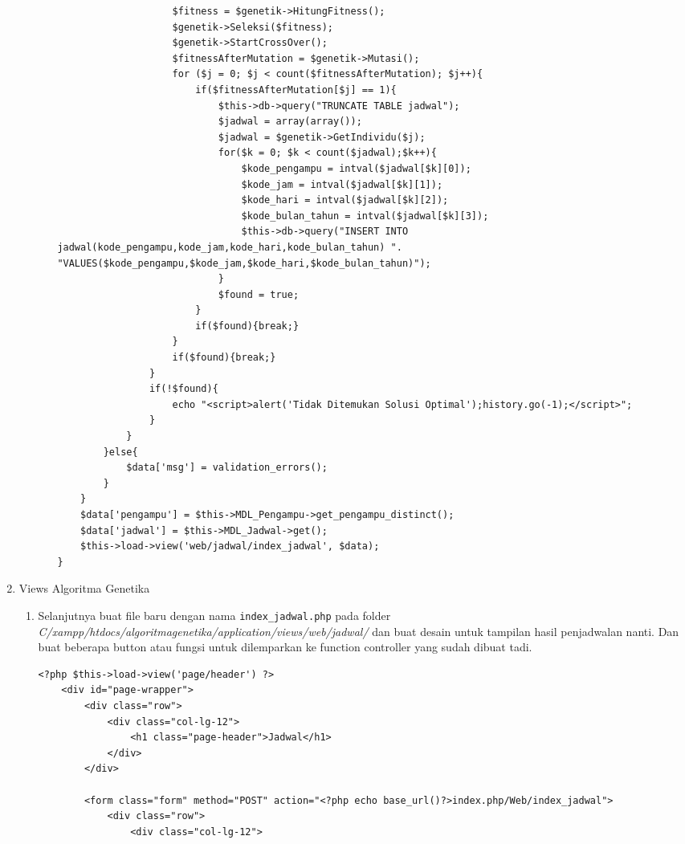 \begin{enumerate}
\begin{enumerate}
\begin{enumerate}
\begin{lstlisting}
					$fitness = $genetik->HitungFitness();
					$genetik->Seleksi($fitness);
					$genetik->StartCrossOver();
					$fitnessAfterMutation = $genetik->Mutasi();
					for ($j = 0; $j < count($fitnessAfterMutation); $j++){
						if($fitnessAfterMutation[$j] == 1){
							$this->db->query("TRUNCATE TABLE jadwal");
							$jadwal = array(array());
							$jadwal = $genetik->GetIndividu($j);
							for($k = 0; $k < count($jadwal);$k++){
								$kode_pengampu = intval($jadwal[$k][0]);
								$kode_jam = intval($jadwal[$k][1]);
								$kode_hari = intval($jadwal[$k][2]);
								$kode_bulan_tahun = intval($jadwal[$k][3]);
								$this->db->query("INSERT INTO jadwal(kode_pengampu,kode_jam,kode_hari,kode_bulan_tahun) ".	 "VALUES($kode_pengampu,$kode_jam,$kode_hari,$kode_bulan_tahun)");
							}
							$found = true;								
						}
						if($found){break;}
					}
					if($found){break;}
				}
				if(!$found){
					echo "<script>alert('Tidak Ditemukan Solusi Optimal');history.go(-1);</script>";
				}
			}
		}else{
			$data['msg'] = validation_errors();
		}
	}	
	$data['pengampu'] = $this->MDL_Pengampu->get_pengampu_distinct();
	$data['jadwal'] = $this->MDL_Jadwal->get();
	$this->load->view('web/jadwal/index_jadwal', $data);
}
\end{lstlisting}
        \end{enumerate}
    \end{enumerate}
        		
        \item Views Algoritma Genetika
        \begin{enumerate}
    	\item Selanjutnya buat file baru dengan nama \verb|index_jadwal.php| pada folder \textit{C/xampp/htdocs/algoritmagenetika/application/views/web/jadwal/} dan buat desain untuk tampilan hasil penjadwalan nanti. Dan buat beberapa button atau fungsi untuk dilemparkan ke function controller yang sudah dibuat tadi.
\begin{lstlisting}
<?php $this->load->view('page/header') ?>
    <div id="page-wrapper">
        <div class="row">
            <div class="col-lg-12">
                <h1 class="page-header">Jadwal</h1>
            </div>
        </div>

        <form class="form" method="POST" action="<?php echo base_url()?>index.php/Web/index_jadwal">
            <div class="row">
                <div class="col-lg-12">


\end{lstlisting}
\end{enumerate}
\end{enumerate}

